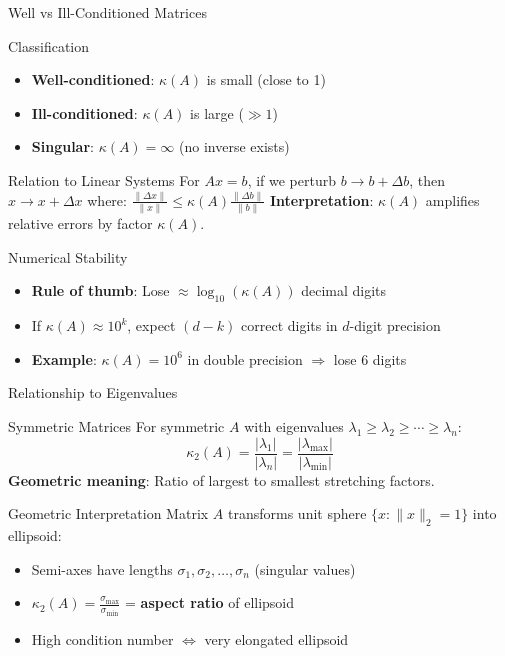\documentclass[aspectratio=1610]{beamer}
\begin{document}
\begin{frame}{Well vs Ill-Conditioned Matrices}

\begin{block}{Classification}
\begin{itemize}
\item \textbf{Well-conditioned}: $\kappa(A)$ is small (close to 1)
\item \textbf{Ill-conditioned}: $\kappa(A)$ is large ($\gg 1$)
\item \textbf{Singular}: $\kappa(A) = \infty$ (no inverse exists)
\end{itemize}
\end{block}

\begin{block}{Relation to Linear Systems}
For $Ax = b$, if we perturb $b \to b + \Delta b$, then $x \to x + \Delta x$ where:
$\frac{\|\Delta x\|}{\|x\|} \leq \kappa(A) \frac{\|\Delta b\|}{\|b\|}$
\textbf{Interpretation}: $\kappa(A)$ amplifies relative errors by factor $\kappa(A)$.
\end{block}

\begin{block}{Numerical Stability}
\begin{itemize}
\item \textbf{Rule of thumb}: Lose $\approx \log_{10}(\kappa(A))$ decimal digits
\item If $\kappa(A) \approx 10^k$, expect $(d-k)$ correct digits in $d$-digit precision
\item \textbf{Example}: $\kappa(A) = 10^6$ in double precision $\Rightarrow$ lose 6 digits
\end{itemize}
\end{block}

\end{frame}

\begin{frame}{Relationship to Eigenvalues}

\begin{block}{Symmetric Matrices}
For symmetric $A$ with eigenvalues $\lambda_1 \geq \lambda_2 \geq \cdots \geq \lambda_n$:
$$\kappa_2(A) = \frac{|\lambda_1|}{|\lambda_n|} = \frac{|\lambda_{\max}|}{|\lambda_{\min}|}$$
\textbf{Geometric meaning}: Ratio of largest to smallest stretching factors.
\end{block}

\begin{block}{Geometric Interpretation}
Matrix $A$ transforms unit sphere $\{x : \|x\|_2 = 1\}$ into ellipsoid:
\begin{itemize}
\item Semi-axes have lengths $\sigma_1, \sigma_2, \ldots, \sigma_n$ (singular values)
\item $\kappa_2(A) = \frac{\sigma_{\max}}{\sigma_{\min}}$ = \textbf{aspect ratio} of ellipsoid
\item High condition number $\Leftrightarrow$ very elongated ellipsoid
\end{itemize}
\end{block}

\end{frame}
\end{document}
